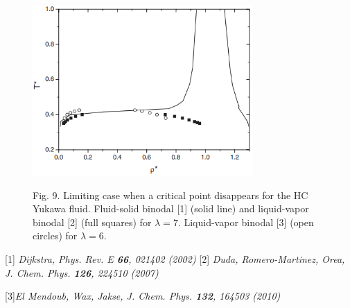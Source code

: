 \documentclass[8pt]{beamer}
\begin{document}
\begin{frame}
\begin{columns}
			\begin{column}{0.5\textwidth}
				\begin{figure}[htbp]
					\includegraphics[width=0.75\textwidth,angle=0]{limit_cp} \\
					\parbox{1.0\textwidth}{\caption*{Fig. 9. Limiting case when a critical point disappears for the HC Yukawa fluid. Fluid-solid binodal [1] (solid line) and liquid-vapor binodal [2] (full squares) for $\lambda=7$. Liquid-vapor binodal [3] (open circles) for $\lambda = 6$.
					}}
				\end{figure}
				
				[1] \textit{Dijkstra, Phys. Rev. E \textbf{66}, 021402 (2002)}
				[2] \textit{Duda, Romero-Martinez, Orea, J. Chem. Phys. \textbf{126}, 224510 (2007)}
				
				[3]\textit{El Mendoub, Wax, Jakse, J. Chem. Phys. \textbf{132}, 164503 (2010)}
			\end{column}
			
		\end{columns}
		
	\end{frame}
	
\end{document}
